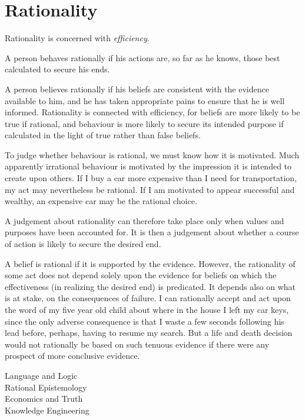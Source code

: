 \section{Rationality}

Rationality is concerned with {\it efficiency}.

A person behaves rationally if his actions are, so far as he knows, those best calculated to secure his ends.

A person believes rationally if his beliefs are consistent with the evidence available to him, and he has taken appropriate pains to ensure that he is well informed.
Rationality is connected with efficiency, for beliefs are more likely to be true if rational, and behaviour is more likely to secure its intended purpose if calculated in the light of true rather than false beliefs.

To judge whether behaviour is rational, we must know how it is motivated.
Much apparently irrational behaviour is motivated by the impression it is intended to create upon others.
If I buy a car more expensive than I need for transportation, my act may nevertheless be rational.
If I am motivated to appear successful and wealthy, an expensive car may be the rational choice.

A judgement about rationality can therefore take place only when values and purposes have been accounted for.
It is then a judgement about whether a course of action is likely to secure the desired end.

A belief is rational if it is supported by the evidence.
However, the rationality of some act does not depend solely upon the evidence for beliefs on which the effectiveness (in realizing the desired end) is predicated.
It depends also on what is at stake, on the consequences of failure.
I can rationally accept and act upon the word of my five year old child about where in the house I left my car keys, since the only adverse consequence is that I waste a few seconds following his lead before, perhaps, having to resume my search.
But a life and death decision would not rationally be based on such tenuous evidence if there were any prospect of more conclusive evidence.

\begin{description}
\item[Language and Logic]
\item[Rational Epistemology]
\item[Economics and Truth]
\item[Knowledge Engineering] 
\end{description}


